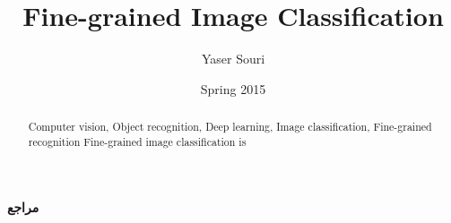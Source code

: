 \documentclass[MsThesis, oneside]{thesis}
\begin{document}

\vspace*{50pt}
{\LARGE{\textbf{مراجع}}}
\vspace{40pt}
\begin{latin}
\renewcommand{\chapter}[2]{}
\end{latin}
\baselineskip\baselineskip 

\PrepareForLatinPages

\date{Spring 2015}
\title{\sffamily ‫Fine-grained Image Classification}
\author{\sffamily Yaser Souri}
\subject{Artificial Intelligence}

\begin{abstract}{Computer vision, Object recognition, Deep learning, Image classification, Fine-grained recognition}
{ %
Fine-grained image classification is 
}
\end{abstract}
\makethesistitle
\end{document}
